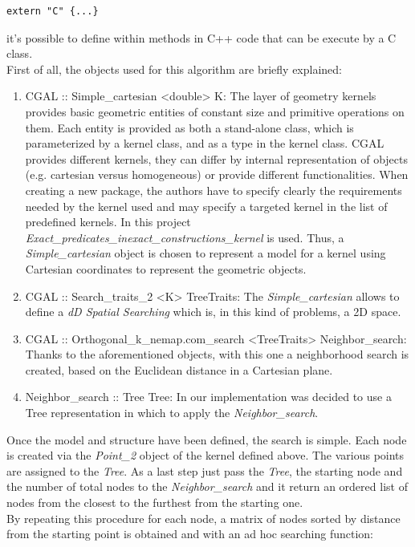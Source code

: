 \begin{lstlisting}
extern "C" {...}
\end{lstlisting}

it's possible to define within methods in C++ code that can be execute by a C class.\\
First of all, the objects used for this algorithm are briefly explained:
\begin{enumerate}
\item CGAL :: Simple\_cartesian <double> K: The layer of geometry kernels provides basic geometric entities of constant size and primitive operations on them. Each entity is provided as both a stand-alone class, which is parameterized by a kernel class, and as a type in the kernel class. CGAL provides different kernels, they can differ by internal representation of objects (e.g. cartesian versus homogeneous) or provide different functionalities. When creating a new package, the authors have to specify clearly the requirements needed by the kernel used and may specify a targeted kernel in the list of predefined kernels. In this project \textit{Exact\_predicates\_inexact\_constructions\_kernel} is used. Thus, a \textit{Simple\_cartesian} object is chosen to represent a model for a kernel using Cartesian coordinates to represent the geometric objects.
\item CGAL :: Search\_traits\_2 <K> TreeTraits: The \textit{Simple\_cartesian} allows to define a \textit{dD Spatial Searching} which is, in this kind of problems, a 2D space.
\item CGAL :: Orthogonal\_k\_nemap.com\_search <TreeTraits> Neighbor\_search: Thanks to the aforementioned objects, with this one a neighborhood search is created, based on the Euclidean distance in a Cartesian plane.
\item Neighbor\_search :: Tree Tree: In our implementation was decided to use a Tree representation in which to apply the \textit{Neighbor\_search}.
\end{enumerate}
Once the model and structure have been defined, the search is simple. Each node is created via the \textit{Point\_2} object of the kernel defined above. The various points are assigned to the \textit{Tree}. As a last step just pass the \textit{Tree}, the starting node and the number of total nodes to the \textit{Neighbor\_search} and it return an ordered list of nodes from the closest to the furthest from the starting one.\\
By repeating this procedure for each node, a matrix of nodes sorted by distance from the starting point is obtained and with an ad hoc searching function:


